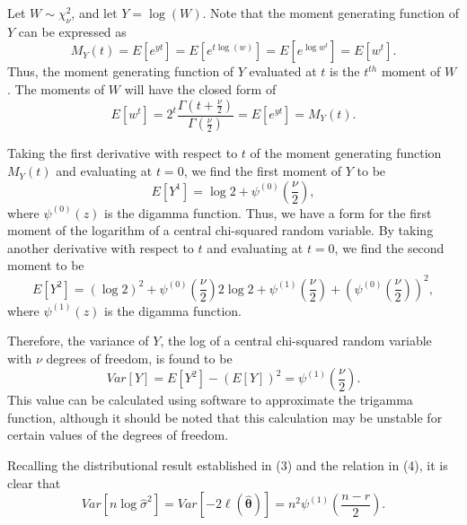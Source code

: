 \documentclass[sn-mathphys-ay]{sn-jnl}
\begin{document}
Let $W \sim \chi^2_{\nu}$, and let $Y = \log(W)$. Note that the moment generating function of $Y$ can be expressed as
\begin{equation*}
	M_Y (t) = E \left[ e^{yt} \right] = E \left[ e^{t\log(w)} \right] = E \left[ e^{\log w^t} \right] = E \left[ w^t \right] .
\end{equation*}
Thus, the moment generating function of $Y$ evaluated at $t$ is the $t^{th}$ moment of $W$. The moments of $W$ will have the
closed form of
\begin{equation*}
	E \left[ w^t \right] = 2^t \frac{\Gamma (t + \frac{\nu}{2})}{\Gamma (\frac{\nu}{2})} = E \left[ e^{yt} \right] = M_Y (t) .
\end{equation*}

Taking the first derivative with respect to $t$ of the moment generating function $M_Y (t)$ and evaluating at $t=0$, we find the first moment of $Y$ to be
\begin{equation*}
	E \left[ Y^1 \right] =  \log 2 + \psi^{(0)} \left( \frac{\nu}{2} \right) ,
\end{equation*}
where $\psi^{(0)}(z)$ is the digamma function. Thus, we have a form for the first moment of the logarithm of a central chi-squared random variable. By taking another
derivative with respect to $t$ and evaluating at $t=0$, we find the second moment to be
\begin{equation*}
	E \left[ Y^2 \right] =
	(\log 2)^2 + \psi^{(0)} \left( \frac{\nu}{2} \right) 2 \log 2  + \psi^{(1)} \left( \frac{\nu}{2} \right) + \left( \psi^{(0)} \left( \frac{\nu}{2} \right) \right)^2 ,
\end{equation*}
where $\psi^{(1)}(z)$ is the digamma function.

Therefore, the variance of $Y$, the log of a central chi-squared random variable with
$\nu$ degrees of freedom, is found to be
\begin{equation*}
	Var \left[ Y \right] = E \left[ Y^2 \right] - \left( E \left[ Y \right] \right)^2 = \psi^{(1)} \left( \frac{\nu}{2} \right) .
\end{equation*}
This value can be calculated using software to approximate the trigamma function, although it should be noted that this calculation may be unstable for certain values of the degrees of freedom.

Recalling the distributional result established in (3) and the relation in (4), it is clear that
\begin{equation*}
	Var \left[ n \log \hat{\sigma}^2 \right] = Var \left[ -2 \ell (\hat{\bm{\theta}} ) \right] = n^2 \psi^{(1)} \left( \frac{n-r}{2} \right).
\end{equation*}
\end{document}
